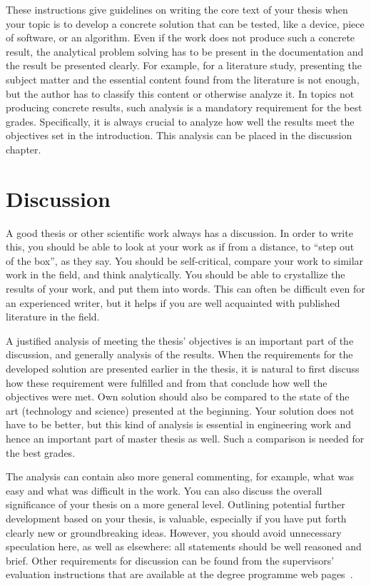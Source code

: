 These instructions give guidelines on writing the core text of your thesis when your topic is to develop a concrete solution that can be tested, like a device, piece of software, or an algorithm. Even if the work does not produce such a concrete result, the analytical problem solving has to be present in the documentation and the result be presented clearly. For example, for a literature study, presenting the subject matter and the essential content found from the literature is not enough, but the author has to classify this content or otherwise analyze it. In topics not producing concrete results, such analysis is a mandatory requirement for the best grades. Specifically, it is always crucial to analyze how well the results meet the objectives set in the introduction. This analysis can be placed in the discussion chapter.

\section{Discussion}

A good thesis or other scientific work always has a discussion. In order to write this, you should be able to look at your work as if from a distance, to \enquote{step out of the box}, as they say. You should be self-critical, compare your work to similar work in the field, and think analytically. You should be able to crystallize the results of your work, and put them into words. This can often be difficult even for an experienced writer, but it helps if you are well acquainted with published literature in the field.

A justified analysis of meeting the thesis’ objectives is an important part of the discussion, and generally analysis of the results. When the requirements for the developed solution are presented earlier in the thesis, it is natural to first discuss how these requirement were fulfilled and from that conclude how well the objectives were met. Own solution should also be compared to the state of the art (technology and science) presented at the beginning. Your solution does not have to be better, but this kind of analysis is essential in engineering work and hence an important part of master thesis as well. Such a comparison is needed for the best grades.

The analysis can contain also more general commenting, for example, what was easy and what was difficult in the work. You can also discuss the overall significance of your thesis on a more general level. Outlining potential further development based on your thesis, is valuable, especially if you have put forth clearly new or groundbreaking ideas. However, you should avoid unnecessary speculation here, as well as elsewhere: all statements should be well reasoned and brief. Other requirements for discussion can be found from the supervisors’ evaluation instructions that are available at the degree programme web pages~\cite{mscstudies}.

